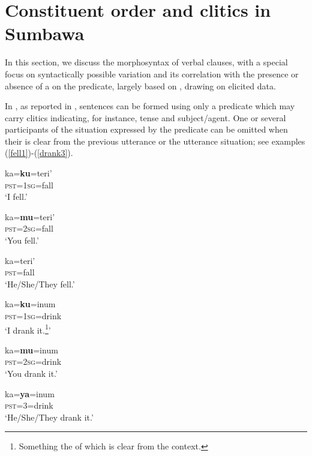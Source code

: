 \documentclass[output=paper
,modfonts
,nonflat]{langsci/langscibook}
\begin{document}
\section{Constituent order and clitics in Sumbawa}\label{sect:grammarOutline}
In this section, we discuss the morphosyntax of  verbal clauses, with a special focus on syntactically possible  variation and its correlation with the presence or absence of a  on the predicate, largely based on \citet{shias13a,shias13b}, drawing on elicited data.

In , as reported in \cite[174]{shias13b}, sentences can be formed using only a predicate which may carry clitics indicating, for instance, tense and subject/agent. One or several participants of the situation expressed by the predicate can be omitted
when their  is clear from the previous utterance or the utterance situation; see examples (\ref{fell1})-(\ref{drank3}).

\begin{multicols}{3}
	\ea\label{fell1}
	\gll ka=\textbf{ku}=teri'\\  
	\textsc{pst=1sg}=fall\\ 
	\glt `I fell.'
	\z
	
	\ea\label{fell2}
	\gll ka=\textbf{mu}=teri'\\
	\textsc{pst=2sg}=fall\\
	\glt `You fell.'
	\z
	
	\ea\label{fell3}
	\gll ka=teri'\\
	\textsc{pst}=fall\\
	\glt `He/She/They fell.'
	\z
\end{multicols}

\begin{multicols}{3}
	\ea\label{drank1}
	\gll ka=\textbf{ku}=inum\\
	\textsc{pst=1sg}=drink\\
	\glt `I drank it.\footnote{Something the  of which is clear from the context.}'
	\z
	
	\ea\label{drank2}
	\gll ka=\textbf{mu}=inum\\
	\textsc{pst=2sg}=drink\\
	\glt `You drank it.'
	\z
	
	\ea\label{drank3}
	\gll ka=\textbf{ya}=inum\\
	\textsc{pst}=3=drink\\
	\glt `He/She/They drank it.'
	\z
\end{multicols}
\end{document}
